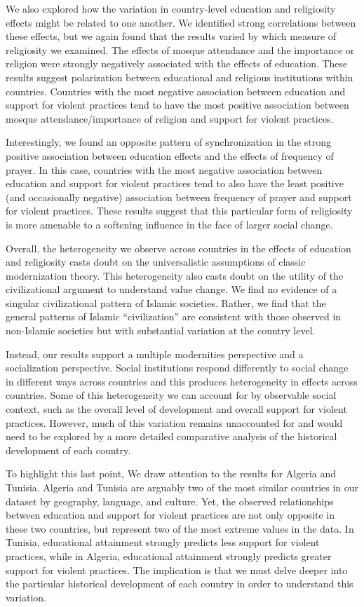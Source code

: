 \documentclass[10pt,letterpaper]{article}
\begin{document}
We also explored how the variation in country-level education and religiosity effects might be related to one another. We identified strong correlations between these effects, but we again found that the results varied by which measure of religiosity we examined. The effects of mosque attendance and the importance or religion were strongly negatively associated with the effects of education. These results suggest polarization between educational and religious institutions within countries. Countries with the most negative association between education and support for violent practices tend to have the most positive association between mosque attendance/importance of religion and support for violent practices.

Interestingly, we found an opposite pattern of synchronization in the strong positive association between education effects and the effects of frequency of prayer. In this case, countries with the most negative association between education and support for violent practices tend to also have the least positive (and occasionally negative) association between frequency of prayer and support for violent practices. These results suggest that this particular form of religiosity is more amenable to a softening influence in the face of larger social change.

Overall, the heterogeneity we observe across countries in the effects of education and religiosity casts doubt on the universalistic assumptions of classic modernization theory. This heterogeneity also casts doubt on the utility of the civilizational argument to understand value change. We find no evidence of a singular civilizational pattern of Islamic societies. Rather, we find that the general patterns of Islamic ``civilization'' are consistent with those observed in non-Islamic societies but with substantial variation at the country level.

Instead, our results support a multiple modernities perspective and a socialization perspective. Social institutions respond differently to social change in different ways across countries and this produces heterogeneity in effects across countries. Some of this heterogeneity we can account for by observable social context, such as the overall level of development and overall support for violent practices. However, much of this variation remains unaccounted for and would need to be explored by a more detailed comparative analysis of the historical development of each country.

To highlight this last point, We draw attention to the results for Algeria and Tunisia. Algeria and Tunisia are arguably two of the most similar countries in our dataset by geography, language, and culture. Yet, the observed relationships between education and support for violent practices are not only opposite in these two countries, but represent two of the most extreme values in the data. In Tunisia, educational attainment strongly predicts less support for violent practices, while in Algeria, educational attainment strongly predicts greater support for violent practices. The implication is that we must delve deeper into the particular historical development of each country in order to understand this variation.
\end{document}
